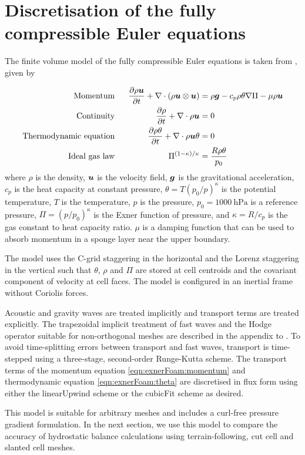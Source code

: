 \section{Discretisation of the fully compressible Euler equations}
\label{sec:slanted:exnerFoamH}

The finite volume model of the fully compressible Euler equations is taken from \citet{weller-shahrokhi2014}, given by

\begin{subequations}
\begin{align}
	\text{Momentum} &\ &\  	\frac{\partial \rho \vect{u}}{\partial t} + \nabla \cdot \left( \rho \vect{u}\otimes\vect{u} \right) &= \rho \vect{g} - c_p \rho \theta \nabla \Pi - \mu \rho \vect{u} \label{eqn:exnerFoam:momentum} \\
	\text{Continuity} &\ &\	\frac{\partial \rho}{\partial t} + \nabla \cdot \rho \vect{u} &= 0 \label{eqn:exnerFoam:cont} \\
	\text{Thermodynamic equation} &\ &\ \frac{\partial \rho \theta}{\partial t} + \nabla \cdot \rho \vect{u} \theta &= 0 \label{eqn:exnerFoam:theta} \\
	\text{Ideal gas law} &\ &\ \Pi^{(1 - \kappa)/\kappa} &= \frac{R \rho \theta}{p_0} \label{eqn:exnerFoam:state}
\end{align}
\end{subequations}
where \(\rho\) is the density, \(\bm{u}\) is the velocity field, \(\bm{g}\) is the gravitational acceleration, \(c_p\) is the heat capacity at constant pressure, \(\theta = T \left(p_0/p\right)^\kappa\) is the potential temperature, \(T\) is the temperature, \(p\) is the pressure, \(p_0 = \SI{1000}{\hecto\pascal}\) is a reference pressure, \(\Pi = \left(p / p_0 \right)^\kappa\) is the Exner function of pressure, and \(\kappa = R/c_p\) is the gas constant to heat capacity ratio.  \(\mu\) is a damping function that can be used to absorb momentum in a sponge layer near the upper boundary.

The model uses the C-grid staggering in the horizontal and the Lorenz staggering in the vertical such that $\theta$, $\rho$ and $\Pi$ are stored at cell centroids and the covariant component of velocity at cell faces.  The model is configured in an inertial frame without Coriolis forces.

Acoustic and gravity waves are treated implicitly and transport terms are treated explicitly.
The trapezoidal implicit treatment of fast waves and the Hodge operator suitable for non-orthogonal meshes are described in the appendix to \citet{shaw-weller2016}.
To avoid time-splitting errors between transport and fast waves, transport is time-stepped using a three-stage, second-order Runge-Kutta scheme.
The transport terms of the momentum equation \eqref{eqn:exnerFoam:momentum} and thermodynamic equation \eqref{eqn:exnerFoam:theta} are discretised in flux form using either the linearUpwind scheme or the cubicFit scheme as desired.

This model is suitable for arbitrary meshes and includes a curl-free pressure gradient formulation.
In the next section, we use this model to compare the accuracy of hydrostatic balance calculations using terrain-following, cut cell and slanted cell meshes.
